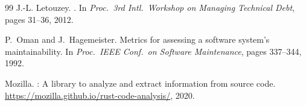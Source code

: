 \documentclass[10pt,twocolumn,letterpaper]{article}
\begin{document}
\begin{thebibliography}{99}
J.-L. Letouzey.
.
\newblock In \emph{Proc.\ 3rd Intl.\ Workshop on Managing Technical Debt},
  pages 31--36, 2012.

P.~Oman and J.~Hagemeister.
\newblock Metrics for assessing a software system's maintainability.
\newblock In \emph{Proc.\ IEEE Conf.\ on Software Maintenance}, pages
  337--344, 1992.

{Mozilla}.
: A library to analyze and extract information
  from source code.
\newblock \url{https://mozilla.github.io/rust-code-analysis/}, 2020.

\end{thebibliography}
\end{document}
